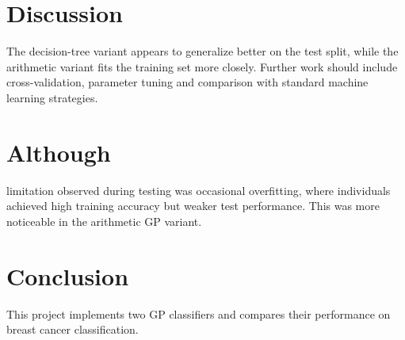 \documentclass{article}
\begin{document}
\section{Discussion}
The decision-tree variant appears to generalize better on the test split, while the arithmetic variant 
fits the training set more closely.
Further work should include cross-validation, parameter tuning and comparison with standard machine learning strategies.

\section{Although}
limitation observed during testing was occasional overfitting, where individuals achieved 
high training accuracy but weaker test performance. 
This was more noticeable in the arithmetic GP variant.

\section{Conclusion}
This project implements two GP classifiers and compares their performance on breast cancer classification.
\end{document}
